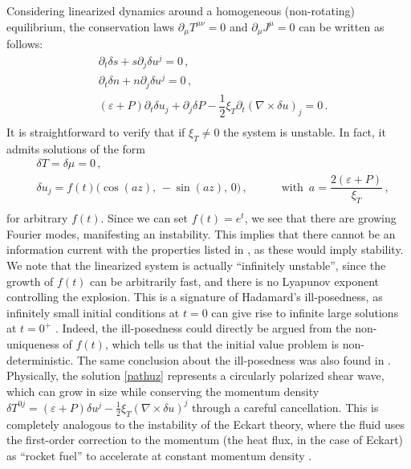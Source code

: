 \documentclass[a4paper, amsfonts, amssymb, amsmath, reprint, showkeys, nofootinbib, twoside,notitlepage,onecolumn,preprintnumbers]{revtex4-2}
\newcommand{\spc}{\quad \quad \quad}
\theoremstyle{definition}
\theoremstyle{theorem}
\theoremstyle{corollary}
\begin{document}
Considering linearized dynamics around a homogeneous (non-rotating) equilibrium, the conservation laws $\partial_\mu T^{\mu \nu}=0$ and $\partial_\mu J^\mu=0$ can be written as follows:
\begin{equation}\label{beatles}
    \begin{split}
& \partial_t \delta s +s \partial_j \delta u^j =0 \, , \\
& \partial_t \delta n +n \partial_j \delta u^j =0 \, ,\\
& (\varepsilon{+}P)\partial_t \delta u_j +\partial_j \delta P - \dfrac{1}{2}\xi_T \partial_t (\nabla {\times} \delta u)_j =0 \, .\\
    \end{split}
\end{equation}
It is straightforward to verify that if $\xi_T \neq 0$ the system is unstable. In fact, it admits solutions of the form
\begin{equation}\label{pathuz}
\begin{split}
   & \delta T = \delta \mu =0 \, , \\
    & \delta u_j =f(t) \big( \cos(az), \,  -\sin(az), \, 0 \big) \, , \spc \text{with }\, a= \dfrac{2(\varepsilon+P)}{\xi_T} \, , \\
\end{split}
\end{equation}
for arbitrary $f(t)$. Since we can set $f(t)=e^{t}$, we see that there are growing Fourier modes, manifesting an instability. This implies that there cannot be an information current with the properties listed in \cite{GavassinoCausality2021}, as these would imply stability. We note that the linearized system is actually ``infinitely unstable'', since the growth of $f(t)$ can be arbitrarily fast, and there is no Lyapunov exponent controlling the explosion. This is a signature of Hadamard's ill-posedness, as infinitely small initial conditions at $t=0$ can give rise to infinite large solutions at $t=0^+$ \cite{Rauch_book}. Indeed, the ill-posedness could directly be argued from the non-uniqueness of $f(t)$, which tells us that the initial value problem is non-deterministic. The same conclusion about the ill-posedness was also found in \cite{Speranza2021}. Physically, the solution \eqref{pathuz} represents a circularly polarized shear wave, which can grow in size while conserving the momentum density $\delta T^{0j}=(\varepsilon{+}P)\delta u^j-\frac{1}{2}\xi_T (\nabla \times \delta u)^j$ through a careful cancellation. This is completely analogous to the instability of the Eckart theory, where the fluid uses the first-order correction to the momentum (the heat flux, in the case of Eckart) as ``rocket fuel'' to accelerate at constant momentum density \cite{GavassinoLyapunov_2020}.
\end{document}
